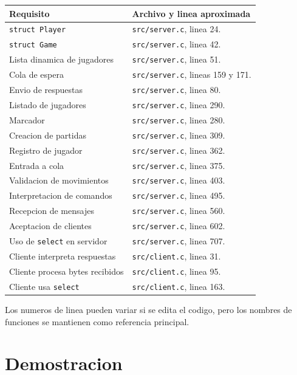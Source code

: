 \documentclass[12pt,a4paper]{article}
\begin{document}
\begin{longtable}{|p{6cm}|p{8cm}|}
\hline
\textbf{Requisito} & \textbf{Archivo y linea aproximada} \\
\hline
\texttt{struct Player} & \texttt{src/server.c}, linea 24. \\
\hline
\texttt{struct Game} & \texttt{src/server.c}, linea 42. \\
\hline
Lista dinamica de jugadores & \texttt{src/server.c}, linea 51. \\
\hline
Cola de espera & \texttt{src/server.c}, lineas 159 y 171. \\
\hline
Envio de respuestas & \texttt{src/server.c}, linea 80. \\
\hline
Listado de jugadores & \texttt{src/server.c}, linea 290. \\
\hline
Marcador & \texttt{src/server.c}, linea 280. \\
\hline
Creacion de partidas & \texttt{src/server.c}, linea 309. \\
\hline
Registro de jugador & \texttt{src/server.c}, linea 362. \\
\hline
Entrada a cola & \texttt{src/server.c}, linea 375. \\
\hline
Validacion de movimientos & \texttt{src/server.c}, linea 403. \\
\hline
Interpretacion de comandos & \texttt{src/server.c}, linea 495. \\
\hline
Recepcion de mensajes & \texttt{src/server.c}, linea 560. \\
\hline
Aceptacion de clientes & \texttt{src/server.c}, linea 602. \\
\hline
Uso de \texttt{select} en servidor & \texttt{src/server.c}, linea 707. \\
\hline
Cliente interpreta respuestas & \texttt{src/client.c}, linea 31. \\
\hline
Cliente procesa bytes recibidos & \texttt{src/client.c}, linea 95. \\
\hline
Cliente usa \texttt{select} & \texttt{src/client.c}, linea 163. \\
\hline
\end{longtable}

Los numeros de linea pueden variar si se edita el codigo, pero los nombres de
funciones se mantienen como referencia principal.

\section{Demostracion}
\end{document}
